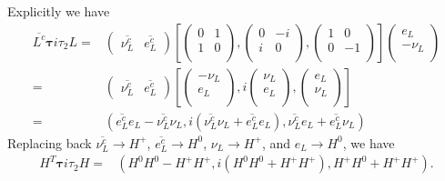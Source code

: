 Explicitly we have
\begin{align*}
  \overline{L^c}\boldsymbol{\tau}i\tau_2L=
  &\begin{pmatrix}
    \overline{\nu^c_L} & \overline{e^c_L}
  \end{pmatrix}\left[ 
  \begin{pmatrix}
    0 &1\\
    1 & 0\\    
  \end{pmatrix},
  \begin{pmatrix}
    0 &-i\\
    i & 0\\    
  \end{pmatrix},
  \begin{pmatrix}
    1 &0\\
    0 & -1\\    
  \end{pmatrix}
 \right]
 \begin{pmatrix}
   e_L\\
  -\nu_L\\
 \end{pmatrix}\nonumber\\
 =&\begin{pmatrix}
    \overline{\nu^c_L} & \overline{e^c_L}
  \end{pmatrix}\left[ 
  \begin{pmatrix}
    -\nu_L\\
    e_L\\
  \end{pmatrix},
  i\begin{pmatrix}
    \nu_L\\
    e_L\\
  \end{pmatrix},
  \begin{pmatrix}
    e_L\\
    \nu_L\\
  \end{pmatrix}
 \right]\nonumber\\
  =&\left(\overline{e^c_L}e_L-\overline{\nu^c_L}\nu_L,
    i\left(\overline{\nu^c_L}\nu_L+\overline{e^c_L}e_L\right),
   \overline{\nu^c_L}e_L+\overline{e^c_L}\nu_L
   \right)
\end{align*}
Replacing back $\overline{\nu^c_L}\to H^+$, $\overline{e^c_L}\to H^0$, $\nu_L\to H^+$, and $e_L\to H^0$, we have
\begin{align*}
H^T \boldsymbol{\tau} i\tau_2H=&
  \left(H^0H^0-H^+H^+,
    i\left( H^0H^0+H^+H^+ \right),
   H^+H^0+H^+H^+
   \right).
\end{align*}
